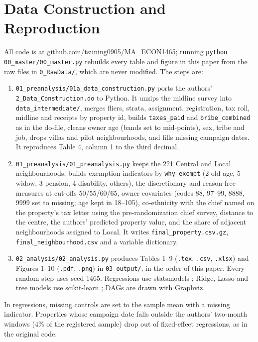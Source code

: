 \documentclass[11pt]{article}
\begin{document}
\appendix
\sloppy
\section{Data Construction and Reproduction}\label{app:data}

All code is at \href{https://github.com/tsuning0905/MA_ECON1465}{github.com/tsuning0905/MA\_ECON1465}; running \texttt{python 00\_master/00\_master.py} rebuilds every table and figure in this paper from the raw files in \texttt{0\_RawData/}, which are never modified. The steps are:
\begin{enumerate}[leftmargin=*,itemsep=0pt]
\item \texttt{01\_preanalysis/01a\_data\_construction.py} ports the authors' \texttt{2\_Data\_Construction.do} to Python. It unzips the midline survey into \texttt{data\_intermediate/}, merges fliers, strata, assignment, registration, tax roll, midline and receipts by property id, builds \texttt{taxes\_paid} and \texttt{bribe\_combined} as in the do-file, cleans owner age (bands set to mid-points), sex, tribe and job, drops villas and pilot neighbourhoods, and fills missing campaign dates. It reproduces Table 4, column 1 to the third decimal.
\item \texttt{01\_preanalysis/01\_preanalysis.py} keeps the 221 Central and Local neighbourhoods; builds exemption indicators by \texttt{why\_exempt} (2 old age, 5 widow, 3 pension, 4 disability, others), the discretionary and reason-free measures at cut-offs 50/55/60/65, owner covariates (codes 88, 97--99, 8888, 9999 set to missing; age kept in 18--105), co-ethnicity with the chief named on the property's tax letter using the pre-randomization chief survey, distance to the centre, the authors' predicted property value, and the share of adjacent neighbourhoods assigned to Local. It writes \texttt{final\_property.csv.gz}, \texttt{final\_neighbourhood.csv} and a variable dictionary.
\item \texttt{02\_analysis/02\_analysis.py} produces Tables 1--9 (\texttt{.tex}, \texttt{.csv}, \texttt{.xlsx}) and Figures 1--10 (\texttt{.pdf}, \texttt{.png}) in \texttt{03\_output/}, in the order of this paper. Every random step uses seed 1465. Regressions use statsmodels \citep{statsmodels}; Ridge, Lasso and tree models use scikit-learn \citep{sklearn}; DAGs are drawn with Graphviz.
\end{enumerate}
In regressions, missing controls are set to the sample mean with a missing indicator. Properties whose campaign date falls outside the authors' two-month windows (4\% of the registered sample) drop out of fixed-effect regressions, as in the original code.
\end{document}
